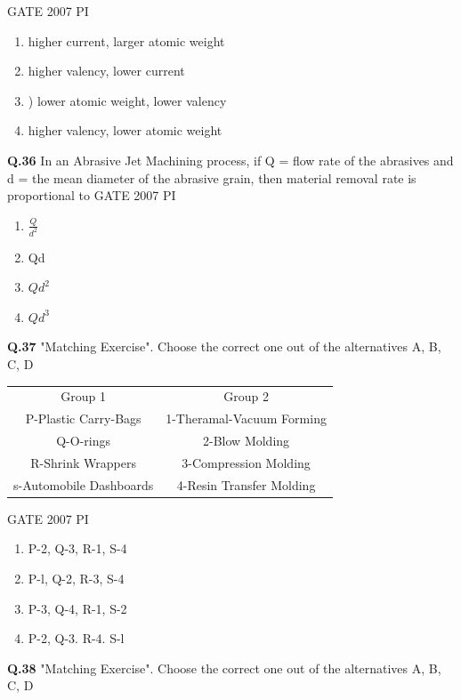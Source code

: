 \documentclass[journal,12pt,onecolumn]{exam}
\theoremstyle{remark}
\begin{document}
    \hfill{GATE 2007 PI}
    \begin{enumerate}
        \item higher current, larger atomic weight
        \item higher valency, lower current
        \item ) lower atomic weight, lower valency 
        \item higher valency, lower atomic weight
    \end{enumerate}
    \noindent
    \textbf{Q.36}
     In an Abrasive Jet Machining process, if Q = flow rate of the abrasives and d = the mean diameter of the abrasive grain, then material removal rate is proportional to
     \hfill{GATE 2007 PI}
     \begin{enumerate}
         \item $\frac{Q}{d^2}$
         \item Qd
         \item $Qd^2$
         \item $Qd^3$
\end{enumerate}
\noindent
\textbf{Q.37}
"Matching Exercise". Choose the correct one out of the alternatives A, B, C, D

    
    \begin{tabular}{c|c}
   Group 1      &  Group 2\\
P-Plastic Carry-Bags         & 1-Theramal-Vacuum Forming \\
Q-O-rings & 2-Blow Molding \\
R-Shrink Wrappers & 3-Compression Molding \\
s-Automobile Dashboards & 4-Resin Transfer Molding

    \end{tabular}
  \hfill{GATE 2007 PI}
  \begin{enumerate}
  \item P-2, Q-3, R-1, S-4
  \item P-l, Q-2, R-3, S-4
  \item P-3, Q-4, R-1, S-2
  \item P-2, Q-3. R-4. S-l
  \end{enumerate}
  \noindent
  \textbf{Q.38}
  "Matching Exercise". Choose the correct one out of the alternatives A, B, C, D
\end{document}
